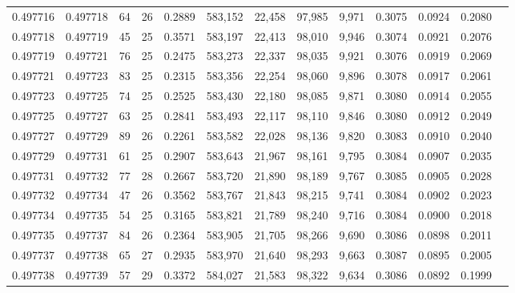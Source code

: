 \begin{tabular}{rrrrrrrrrrrrr}
0.497716 & 0.497718 &  64 &  26 &                                     0.2889 & 583,152 &  22,458 &  97,985 &   9,971 & 0.3075 & 0.0924 & 0.2080 \\
0.497718 & 0.497719 &  45 &  25 &                                     0.3571 & 583,197 &  22,413 &  98,010 &   9,946 & 0.3074 & 0.0921 & 0.2076 \\
0.497719 & 0.497721 &  76 &  25 &                                     0.2475 & 583,273 &  22,337 &  98,035 &   9,921 & 0.3076 & 0.0919 & 0.2069 \\
0.497721 & 0.497723 &  83 &  25 &                                     0.2315 & 583,356 &  22,254 &  98,060 &   9,896 & 0.3078 & 0.0917 & 0.2061 \\
0.497723 & 0.497725 &  74 &  25 &                                     0.2525 & 583,430 &  22,180 &  98,085 &   9,871 & 0.3080 & 0.0914 & 0.2055 \\
0.497725 & 0.497727 &  63 &  25 &                                     0.2841 & 583,493 &  22,117 &  98,110 &   9,846 & 0.3080 & 0.0912 & 0.2049 \\
0.497727 & 0.497729 &  89 &  26 &                                     0.2261 & 583,582 &  22,028 &  98,136 &   9,820 & 0.3083 & 0.0910 & 0.2040 \\
0.497729 & 0.497731 &  61 &  25 &                                     0.2907 & 583,643 &  21,967 &  98,161 &   9,795 & 0.3084 & 0.0907 & 0.2035 \\
0.497731 & 0.497732 &  77 &  28 &                                     0.2667 & 583,720 &  21,890 &  98,189 &   9,767 & 0.3085 & 0.0905 & 0.2028 \\
0.497732 & 0.497734 &  47 &  26 &                                     0.3562 & 583,767 &  21,843 &  98,215 &   9,741 & 0.3084 & 0.0902 & 0.2023 \\
0.497734 & 0.497735 &  54 &  25 &                                     0.3165 & 583,821 &  21,789 &  98,240 &   9,716 & 0.3084 & 0.0900 & 0.2018 \\
0.497735 & 0.497737 &  84 &  26 &                                     0.2364 & 583,905 &  21,705 &  98,266 &   9,690 & 0.3086 & 0.0898 & 0.2011 \\
0.497737 & 0.497738 &  65 &  27 &                                     0.2935 & 583,970 &  21,640 &  98,293 &   9,663 & 0.3087 & 0.0895 & 0.2005 \\
0.497738 & 0.497739 &  57 &  29 &                                     0.3372 & 584,027 &  21,583 &  98,322 &   9,634 & 0.3086 & 0.0892 & 0.1999 \\

\end{tabular}
